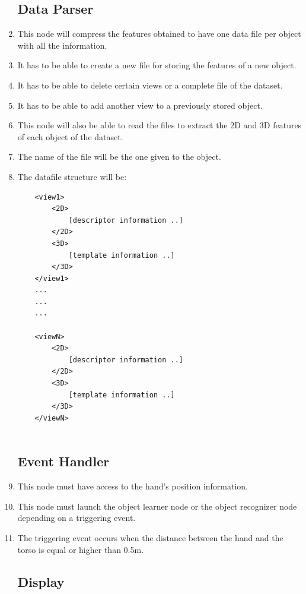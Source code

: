 \documentclass{article}
\makeatletter
\def\threedigits#1{\expandafter\@threedigits\csname c@#1\endcsname}
\def\@threedigits#1{%
  \ifnum#1<100 0\fi
  \ifnum#1<10 0\fi
  \number#1}
\makeatother
\begin{document}
\begin{enumerate}[label=\textbf{FR\threedigits*}, leftmargin=2cm]
\subsection{Data Parser}
\item This node will compress the features obtained to have one data file per object with all the information.
 
\item It has to be able to create a new file for storing the features of a new object. 
\item It has to be able to delete certain views or a complete file of the dataset. 
\item It has to be able to add another view to a previously stored object. 

\item This node will also be able to read the files to extract the 2D and 3D features of each object of the dataset. 

\item The name of the file will be the one given to the object. 

\item The datafile structure will be: \\
		\begin{lstlisting}
	<view1>
		<2D>
			[descriptor information ..]
		</2D>
		<3D>
			[template information ..]
		</3D>
	</view1>	
	...
	...
	...		
			
	<viewN>
		<2D>
			[descriptor information ..]
		</2D>
		<3D>
			[template information ..]
		</3D>
	</viewN>	
		
		\end{lstlisting}
	


 
\subsection{Event Handler}
\item This node must have access to the hand's position information. 
\item This node must launch the object learner node or the object recognizer node depending on a triggering event. 
\item The triggering event occurs when the distance between the hand and the torso is equal or higher than 0.5m.   
 
\subsection{Display}


\end{enumerate}
\end{document}

